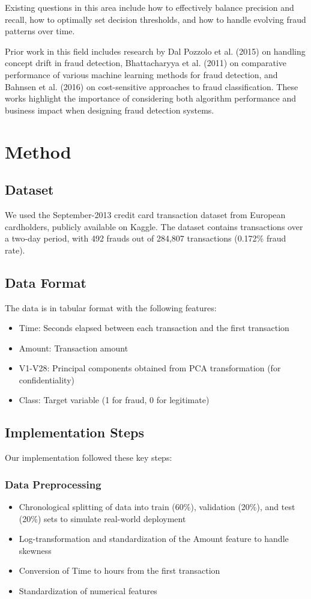 \documentclass{article}
\begin{document}
Existing questions in this area include how to effectively balance precision and recall, how to optimally set decision thresholds, and how to handle evolving fraud patterns over time.

Prior work in this field includes research by Dal Pozzolo et al. (2015) on handling concept drift in fraud detection, Bhattacharyya et al. (2011) on comparative performance of various machine learning methods for fraud detection, and Bahnsen et al. (2016) on cost-sensitive approaches to fraud classification. These works highlight the importance of considering both algorithm performance and business impact when designing fraud detection systems.

\section{Method}
\subsection{Dataset}
We used the September-2013 credit card transaction dataset from European cardholders, publicly available on Kaggle. The dataset contains transactions over a two-day period, with 492 frauds out of 284,807 transactions (0.172\% fraud rate).

\subsection{Data Format}
The data is in tabular format with the following features:
\begin{itemize}
    \item Time: Seconds elapsed between each transaction and the first transaction
    \item Amount: Transaction amount
    \item V1-V28: Principal components obtained from PCA transformation (for confidentiality)
    \item Class: Target variable (1 for fraud, 0 for legitimate)
\end{itemize}

\subsection{Implementation Steps}
Our implementation followed these key steps:

\subsubsection{Data Preprocessing}
\begin{itemize}
    \item Chronological splitting of data into train (60\%), validation (20\%), and test (20\%) sets to simulate real-world deployment
    \item Log-transformation and standardization of the Amount feature to handle skewness
    \item Conversion of Time to hours from the first transaction
    \item Standardization of numerical features
\end{itemize}
\end{document}
